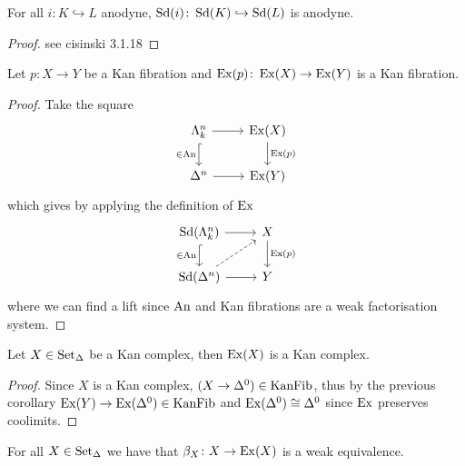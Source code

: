\begin{prop}
    For all $i\colon K \hookrightarrow L$ anodyne, $\operatorname{Sd}(i) \colon \operatorname{Sd}(K) \hookrightarrow \operatorname{Sd}(L)$ is anodyne.
\end{prop}

\begin{proof}
    see cisinski 3.1.18
\end{proof}

\begin{cor}
\label{Ex preserves Kan fibrations}
    Let $p\colon X \to Y$ be a Kan fibration and $\operatorname{Ex}(p) \colon \operatorname{Ex}(X) \to \operatorname{Ex}(Y)$ is a Kan fibration.
\end{cor}

\begin{proof}
    Take the square
    \[
    \begin{tikzcd}
        \Lambda_k^n
        \ar[d, hook, "\in \An"']
        \ar[r]
        &
        \Ex(X)
        \ar[d, "\Ex(p)"]
        \\
        \Delta^n 
        \rar
        &
        \Ex(Y)
    \end{tikzcd}
    \]
    which gives by applying the definition of $\operatorname{Ex}$
    \[
    \begin{tikzcd}
        \Sd(\Lambda_k^n)
        \ar[d, hook, "\in \An"']
        \ar[r]
        &
        X
        \ar[d, "\Ex(p)"]
        \\
        \Sd(\Delta^n )
        \ar[ru, dashed]
        \rar
        &
        Y
    \end{tikzcd}
    \]
    where we can find a lift since $\operatorname{An}$ and Kan fibrations are a weak factorisation system.
\end{proof}

\begin{cor}
    Let $X \in \operatorname{Set}_{\Delta}$ be a Kan complex, then $\operatorname{Ex}(X)$ is a Kan complex.
\end{cor}

\begin{proof}
    Since $X$ is a Kan complex, $(X \to \Delta^0) \in \operatorname{KanFib}$, thus by the previous corollary $\operatorname{Ex}(Y) \to \operatorname{Ex}(\Delta^0) \in \operatorname{KanFib}$ and $\operatorname{Ex}(\Delta^0)\cong \Delta^0$ since $\operatorname{Ex}$ preserves coolimits. 
\end{proof}

\begin{thm}
    For all $X \in \operatorname{Set}_{\Delta}$ we have that $\beta_X \colon X \to \operatorname{Ex}(X)$ is a weak equivalence. 
\end{thm}

